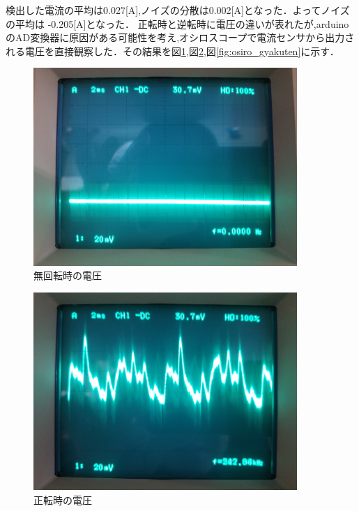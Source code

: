 検出した電流の平均は0.027[A],ノイズの分散は0.002[A]となった．よってノイズの平均は -0.205[A]となった．
正転時と逆転時に電圧の違いが表れたが,arduinoのAD変換器に原因がある可能性を考え,オシロスコープで電流センサから出力される電圧を直接観察した．その結果を図\ref{fig:osiro_0},図\ref{fig:osiro_seiten},図\ref{fig:osiro_gyakuten}に示す．

\begin{figure}[htbp]
 \begin{center}
    \includegraphics[width=100mm]{img/osiro_0.jpg}
    \end{center}
  \caption{無回転時の電圧}
 \label{fig:osiro_0}
\end{figure}

\begin{figure}[htbp]
 \begin{center}
    \includegraphics[width=100mm]{img/osiro_seiten.jpg}
    \end{center}
  \caption{正転時の電圧}
 \label{fig:osiro_seiten}
\end{figure}

